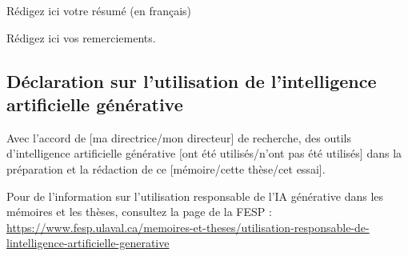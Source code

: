 \documentclass[12pt]{ulaval}
\date{Mois Année}
\begin{document}
  \maketitle

\frontmatter %
\pagestyle{plain} %
\setcounter{page}{2}

  \begin{resume}
    Rédigez ici votre résumé (en français)
  \end{resume}

  \begin{abstract}
    Rédigez ici votre abstract (en anglais).
  \end{abstract}

% 
  \hypersetup{linkcolor=black}
   \setcounter{tocdepth}{2}
  \tableofcontents

  \listoftables

  \listoffigures

  \begin{remerciements}
    Rédigez ici vos remerciements.
  \end{remerciements}

  \begin{avantpropos}
    \hypertarget{duxe9claration-sur-lutilisation-de-lintelligence-artificielle-guxe9nuxe9rative}{%
    \section*{Déclaration sur l'utilisation de l'intelligence artificielle générative}\label{duxe9claration-sur-lutilisation-de-lintelligence-artificielle-guxe9nuxe9rative}}

    Avec l'accord de {[}ma directrice/mon directeur{]} de recherche, des outils d'intelligence artificielle générative {[}ont été utilisés/n'ont pas été utilisés{]} dans la préparation et la rédaction de ce {[}mémoire/cette thèse/cet essai{]}.

    Pour de l'information sur l'utilisation responsable de l'IA générative dans les mémoires et les thèses, consultez la page de la FESP : \url{https://www.fesp.ulaval.ca/memoires-et-theses/utilisation-responsable-de-lintelligence-artificielle-generative}
  \end{avantpropos}

% 
\mainmatter %
\pagestyle{fancyplain} %
\end{document}
